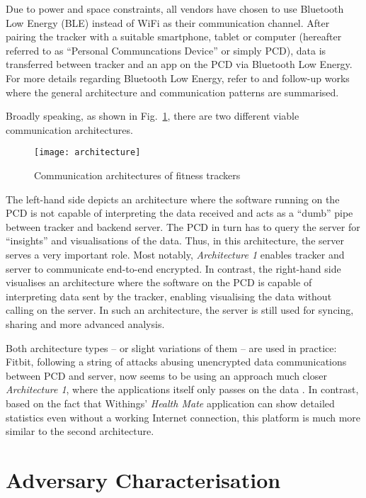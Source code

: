 \documentclass[english]{lni}
\begin{document}
Due to power and space constraints, all vendors have chosen to use Bluetooth Low Energy (BLE) instead of WiFi as their communication channel. After pairing the tracker with a suitable smartphone, tablet or computer (hereafter referred to as ``Personal Communcations Device'' or simply PCD), data is transferred between tracker and an app on the PCD via Bluetooth Low Energy. For more details regarding Bluetooth Low Energy, refer to \cite{BLE1} and follow-up works where the general architecture and communication patterns are summarised.

Broadly speaking, as shown in Fig.~\ref{fig:architectures}, there are two different viable communication architectures. 

\begin{figure}[htb]
	\caption{Communication architectures of fitness trackers}
	\label{fig:architectures}
	\centering
	\texttt{[image: architecture]}
\end{figure}

The left-hand side depicts an architecture where the software running on the PCD is not capable of interpreting the data received and acts as a ``dumb'' pipe between tracker and backend server. The PCD in turn has to query the server for ``insights'' and visualisations of the data. Thus, in this architecture, the server serves a very important role. Most notably, \emph{Architecture 1} enables tracker and server to communicate end-to-end encrypted. In contrast, the right-hand side visualises an architecture where the software on the PCD is capable of interpreting data sent by the tracker, enabling visualising the data without calling on the server. In such an architecture, the server is still used for syncing, sharing and more advanced analysis.

Both architecture types -- or slight variations of them -- are used in practice: Fitbit, following a string of attacks abusing unencrypted data communications between PCD and server, now seems to be using an approach much closer \emph{Architecture 1}, where the applications itself only passes on the data \cite{FitbitReimplemented, cyr2014security}. In contrast, based on the fact that Withings' \emph{Health Mate} application can show detailed statistics even without a working Internet connection, this platform is much more similar to the second architecture.

\section{Adversary Characterisation}
\label{adversary_model}
\end{document}
